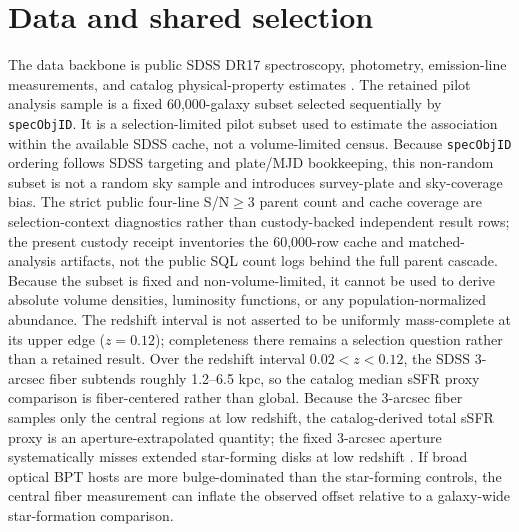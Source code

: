 \documentclass[twocolumn]{aastex631}
\begin{document}
\section{Data and shared selection}
The data backbone is public SDSS DR17 spectroscopy, photometry, emission-line measurements, and catalog physical-property estimates \citep{york2000,sdssdr17,brinchmann2004}. The retained pilot analysis sample is a fixed 60,000-galaxy subset selected sequentially by \texttt{specObjID}. It is a selection-limited pilot subset used to estimate the association within the available SDSS cache, not a volume-limited census. Because \texttt{specObjID} ordering follows SDSS targeting and plate/MJD bookkeeping, this non-random subset is not a random sky sample and introduces survey-plate and sky-coverage bias. The strict public four-line S/N$\geq3$ parent count and cache coverage are selection-context diagnostics rather than custody-backed independent result rows; the present custody receipt inventories the 60,000-row cache and matched-analysis artifacts, not the public SQL count logs behind the full parent cascade. Because the subset is fixed and non-volume-limited, it cannot be used to derive absolute volume densities, luminosity functions, or any population-normalized abundance. The redshift interval is not asserted to be uniformly mass-complete at its upper edge ($z=0.12$); completeness there remains a selection question rather than a retained result.
Over the redshift interval $0.02<z<0.12$, the SDSS 3-arcsec fiber subtends roughly 1.2--6.5 kpc, so the catalog median sSFR proxy comparison is fiber-centered rather than global.
Because the 3-arcsec fiber samples only the central regions at low redshift, the catalog-derived total sSFR proxy is an aperture-extrapolated quantity; the fixed 3-arcsec aperture systematically misses extended star-forming disks at low redshift \citep{kewley2005}. If broad optical BPT hosts are more bulge-dominated than the star-forming controls, the central fiber measurement can inflate the observed offset relative to a galaxy-wide star-formation comparison.
\end{document}
